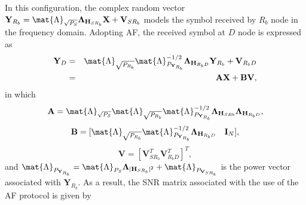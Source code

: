 In this configuration, the complex random vector $ \mathbf{Y}_{R_b} = \mat{\Lambda}_{\sqrt{P_{S}}} \mathbf{\Lambda}_{\mathbf{H}_{SR_b}} \mathbf{X} + \mathbf{V}_{SR_b} $ models the symbol received by $R_{b}$ node in the frequency domain. Adopting \ac{AF}, the received symbol at $D$ node is expressed as
\begin{eqnarray}
	\mathbf{Y}_{D} & = & \mat{\Lambda}_{\sqrt{P_{R_b}}} \mat{\Lambda}_{P_{\mathbf{Y}_{R_{b}}}}^{-1/2} \mathbf{\Lambda}_{\mathbf{H}_{R_{b}D}} \mathbf{Y}_{R_{b}} + \mathbf{V}_{R_{b}D}\nonumber\\
	& = & \mathbf{A} \mathbf{X} + \mathbf{B}\mathbf{V},
\end{eqnarray}
in which 
\begin{equation}
	\mathbf{A} =  \mat{\Lambda}_{\sqrt{P_{S}}} \mat{\Lambda}_{\sqrt{P_{R_{b}}}} \mat{\Lambda}_{P_{\mathbf{Y}_{R_{b}}}}^{-1/2} \mathbf{\Lambda}_{\mathbf{H}_{SR{b}}} \mathbf{\Lambda}_{\mathbf{H}_{R_{b}D}},
\end{equation}
\begin{equation}
	\mathbf{B} = [\mat{\Lambda}_{\sqrt{P_{R_{b}}}} \mat{\Lambda}_{P_{\mathbf{Y}_{R_{b}}}}^{-1/2} \mathbf{\Lambda}_{\mathbf{H}_{R_{b}D}} \ \ \ \mathbf{I}_{N}],
\end{equation}
\begin{equation}
	\mathbf{V} = [\mathbf{V}_{SR_{b}}^T \mathbf{V}_{R_{b}D}^T]^T ,
\end{equation}
and $ \mat{\Lambda}_{P_{\mathbf{Y}_{R_{b}}}} = \mat{\Lambda}_{P_{S}} \mathbf{\Lambda}_{|\mathbf{H}_{SR_b}|^2} + \mat{\Lambda}_{P_{\mathbf{V}_{SR_{b}}}} $ is the power vector associated with $ \mathbf{Y}_{R_{b}} $. As a result, the \ac{SNR} matrix associated with the use of the \ac{AF} protocol is given by


